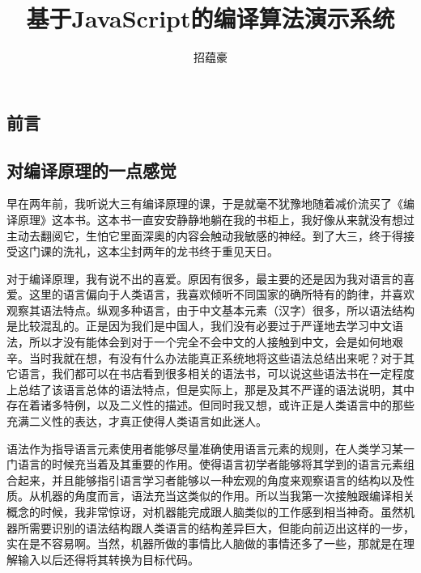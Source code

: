 \documentclass[12pt,leqno]{book}
\begin{document}
\begin{CJK}{UTF8}{gbsn}

\title{\bf{基于JavaScript的编译算法演示系统}}
\author{招蕴豪}
\maketitle
\newpage

\renewcommand{\contentsname}{目录}
\tableofcontents

\chapter*{前言}
\pagestyle{plain}

\section*{对编译原理的一点感觉}
早在两年前，我听说大三有编译原理的课，于是就毫不犹豫地随着减价流买了《编译原理》这本书。这本书一直安安静静地躺在我的书柜上，我好像从来就没有想过主动去翻阅它，生怕它里面深奥的内容会触动我敏感的神经。到了大三，终于得接受这门课的洗礼，这本尘封两年的龙书终于重见天日。

对于编译原理，我有说不出的喜爱。原因有很多，最主要的还是因为我对语言的喜爱。这里的语言偏向于人类语言，我喜欢倾听不同国家的确所特有的韵律，并喜欢观察其语法特点。纵观多种语言，由于中文基本元素（汉字）很多，所以语法结构是比较混乱的。正是因为我们是中国人，我们没有必要过于严谨地去学习中文语法，所以才没有能体会到对于一个完全不会中文的人接触到中文，会是如何地艰辛。当时我就在想，有没有什么办法能真正系统地将这些语法总结出来呢？对于其它语言，我们都可以在书店看到很多相关的语法书，可以说这些语法书在一定程度上总结了该语言总体的语法特点，但是实际上，那是及其不严谨的语法说明，其中存在着诸多特例，以及二义性的描述。但同时我又想，或许正是人类语言中的那些充满二义性的表达，才真正使得人类语言如此迷人。


语法作为指导语言元素使用者能够尽量准确使用语言元素的规则，在人类学习某一门语言的时候充当着及其重要的作用。使得语言初学者能够将其学到的语言元素组合起来，并且能够指引语言学习者能够以一种宏观的角度来观察语言的结构以及性质。从机器的角度而言，语法充当这类似的作用。所以当我第一次接触跟编译相关概念的时候，我非常惊讶，对机器能完成跟人脑类似的工作感到相当神奇。虽然机器所需要识别的语法结构跟人类语言的结构差异巨大，但能向前迈出这样的一步，实在是不容易啊。当然，机器所做的事情比人脑做的事情还多了一些，那就是在理解输入以后还得将其转换为目标代码。


\end{CJK}
\end{document}
